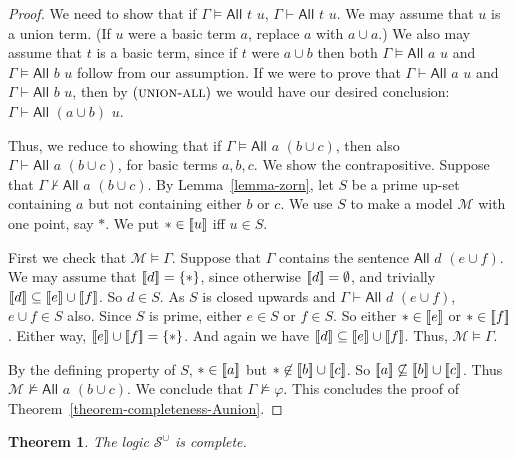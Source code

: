 \documentclass[letterpaper]{article}
\newtheorem{theorem}{Theorem}[section]
\theoremstyle{definition}
\newcommand{\semantics}[1]{[\![\mbox{\em $ #1 $\/}]\!]}
\newcommand{\Model}{\mathcal{M}}
\newcommand{\set}[1]{\{ #1 \}}
\newcommand{\proves}{\vdash}
\newcommand{\Sunion}{\mathscr{S}^{\cup}}
\newcommand{\proverule}{\textsc}
\newcommand{\All}[2]{\mathsf{All}\,\,#1\,\,#2}
\begin{document}
\begin{proof}
We need to show that if $\Gamma\models \All{t}{u}$,
$\Gamma\proves \All{t}{u}$.
We may assume that $u$ is a union term.  (If $u$ were a basic term $a$, replace $a$ with $a\cup a$.)
We also may assume that $t$ is a basic term, since if $t$ were $a \cup b$ then both $\Gamma\models \All{a}{u}$
and $\Gamma\models \All{b}{u}$ follow from our assumption.   If we were to prove that $\Gamma \vdash \All{a}{u}$ and $\Gamma \vdash \All{b}{u}$, then by $(\proverule{union-all})$
we would have our desired conclusion:
$\Gamma \vdash \All{(a \cup b)}{u}$.

Thus, we reduce to showing that if  $\Gamma\models \All{a}{(b \cup c)}$, then also  $\Gamma \proves \All{a}{(b \cup c)}$, for basic terms $a, b, c$.
We show the contrapositive.   Suppose
 that $\Gamma\not\proves \All{a}{(b \cup c)}$.
By Lemma~\ref{lemma-zorn}, let $S$ be a prime up-set containing $a$ but not containing either $b$ or $c$.
We use $S$ to make a model $\Model$ with one point, say $*$.   We put $*\in \semantics{u}$ iff $u\in S$.

First we check that $\Model\models \Gamma$.  
Suppose that $\Gamma$ contains the sentence $\All{d}{(e \cup f)}$. We may assume that $\semantics{d} = \set{*}$, 
since otherwise $\semantics{d} = \emptyset$, and trivially $\semantics{d}\subseteq \semantics{e}\cup\semantics{f}$.
So $d \in S$.  As $S$ is closed upwards and $\Gamma \proves \All{d}{(e \cup f)}$, $e \cup f\in S$ also.   Since $S$ is prime, either $e\in S$ or $f\in S$.
So either $*\in\semantics{e}$ or $*\in \semantics{f}$.  Either way, $\semantics{e} \cup \semantics{f} = \set{*}$.  And again we have 
$\semantics{d}\subseteq \semantics{e}\cup\semantics{f}$.
Thus, $\Model\models \Gamma$.  

By the defining property of $S$, $*\in \semantics{a}$ but $*\not\in \semantics{b}\cup\semantics{c}$.   So 
$ \semantics{a} \not\subseteq \semantics{b}\cup\semantics{c}$.  Thus $\Model \not\models \All{a}{(b \cup c)}$.  We conclude that $\Gamma \not\models \varphi$.
This concludes the proof of Theorem~\ref{theorem-completeness-Aunion}.
\end{proof}


\begin{theorem}
    The logic $\Sunion$ is complete.
    \label{theorem-completeness-Sunion}
\end{theorem}
 
\end{document}
